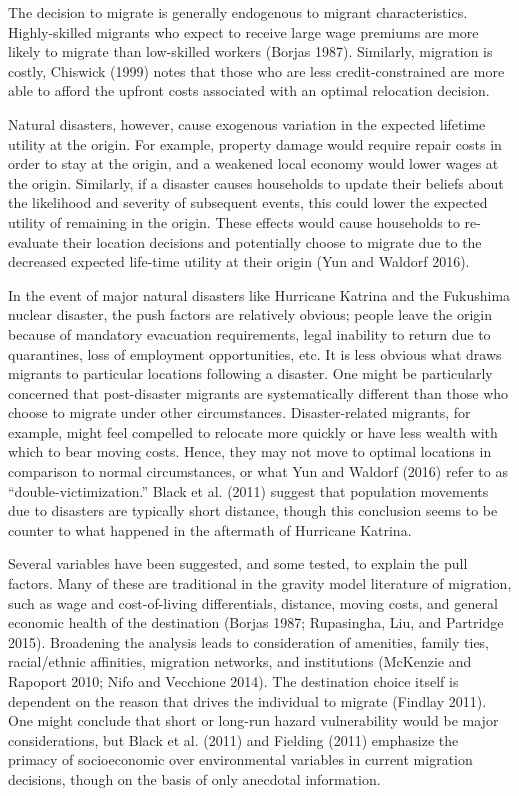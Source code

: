 \documentclass[]{article}
\begin{document}
The decision to migrate is generally endogenous to migrant
characteristics. Highly-skilled migrants who expect to receive large
wage premiums are more likely to migrate than low-skilled workers
(Borjas 1987). Similarly, migration is costly, Chiswick (1999) notes
that those who are less credit-constrained are more able to afford the
upfront costs associated with an optimal relocation decision.

Natural disasters, however, cause exogenous variation in the expected
lifetime utility at the origin. For example, property damage would
require repair costs in order to stay at the origin, and a weakened
local economy would lower wages at the origin. Similarly, if a disaster
causes households to update their beliefs about the likelihood and
severity of subsequent events, this could lower the expected utility of
remaining in the origin. These effects would cause households to
re-evaluate their location decisions and potentially choose to migrate
due to the decreased expected life-time utility at their origin (Yun and
Waldorf 2016).

In the event of major natural disasters like Hurricane Katrina and the
Fukushima nuclear disaster, the push factors are relatively obvious;
people leave the origin because of mandatory evacuation requirements,
legal inability to return due to quarantines, loss of employment
opportunities, etc. It is less obvious what draws migrants to particular
locations following a disaster. One might be particularly concerned that
post-disaster migrants are systematically different than those who
choose to migrate under other circumstances. Disaster-related migrants,
for example, might feel compelled to relocate more quickly or have less
wealth with which to bear moving costs. Hence, they may not move to
optimal locations in comparison to normal circumstances, or what Yun and
Waldorf (2016) refer to as ``double-victimization.'' Black et al. (2011)
suggest that population movements due to disasters are typically short
distance, though this conclusion seems to be counter to what happened in
the aftermath of Hurricane Katrina.

Several variables have been suggested, and some tested, to explain the
pull factors. Many of these are traditional in the gravity model
literature of migration, such as wage and cost-of-living differentials,
distance, moving costs, and general economic health of the destination
(Borjas 1987; Rupasingha, Liu, and Partridge 2015). Broadening the
analysis leads to consideration of amenities, family ties, racial/ethnic
affinities, migration networks, and institutions (McKenzie and Rapoport
2010; Nifo and Vecchione 2014). The destination choice itself is
dependent on the reason that drives the individual to migrate (Findlay
2011). One might conclude that short or long-run hazard vulnerability
would be major considerations, but Black et al. (2011) and Fielding
(2011) emphasize the primacy of socioeconomic over environmental
variables in current migration decisions, though on the basis of only
anecdotal information.
\end{document}
